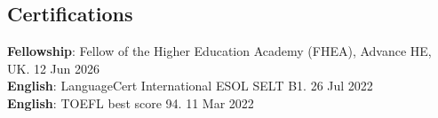 \documentclass[margin,line]{res}
\begin{document}
\begin{resume}
\section{\sc Certifications}
{\bf Fellowship}: Fellow of the Higher Education Academy (FHEA), Advance HE, UK. \hfill 12 Jun 2026\\
{\bf English}: LanguageCert International ESOL SELT B1. \hfill 26 Jul 2022\\
{\bf English}: TOEFL best score 94. \hfill 11 Mar 2022\\







\end{resume}
\end{document}
